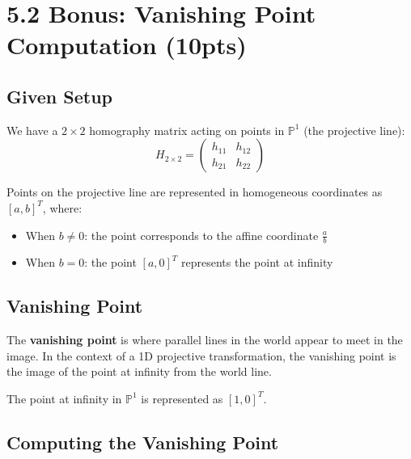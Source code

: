 \documentclass[12pt]{article}
\begin{document}
\section*{5.2 Bonus: Vanishing Point Computation (10pts)}


\subsection*{Given Setup}

We have a $2 \times 2$ homography matrix acting on points in $\mathbb{P}^1$ (the projective line):
\[
H_{2 \times 2} = \begin{pmatrix} h_{11} & h_{12} \\ h_{21} & h_{22} \end{pmatrix}
\]

Points on the projective line are represented in homogeneous coordinates as $[a, b]^T$, where:
\begin{itemize}
    \item When $b \neq 0$: the point corresponds to the affine coordinate $\frac{a}{b}$
    \item When $b = 0$: the point $[a, 0]^T$ represents the point at infinity
\end{itemize}

\subsection*{Vanishing Point}

The \textbf{vanishing point} is where parallel lines in the world appear to meet in the image. In the context of a 1D projective transformation, the vanishing point is the image of the point at infinity from the world line.

The point at infinity in $\mathbb{P}^1$ is represented as $[1, 0]^T$.

\subsection*{Computing the Vanishing Point}
\end{document}
